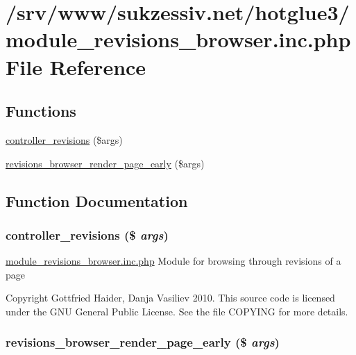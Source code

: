 \hypertarget{module__revisions__browser_8inc_8php}{
\section{/srv/www/sukzessiv.net/hotglue3/module\_\-revisions\_\-browser.inc.php File Reference}
\label{module__revisions__browser_8inc_8php}
}
\subsection*{Functions}
\begin{CompactItemize}
\item 
\hyperlink{module__revisions__browser_8inc_8php_9eda010871ad706aca87cfd7b9dd0f7d}{controller\_\-revisions} (\$args)
\item 
\hyperlink{module__revisions__browser_8inc_8php_eb482f35141c71dd933daeec9e9ce599}{revisions\_\-browser\_\-render\_\-page\_\-early} (\$args)
\end{CompactItemize}


\subsection{Function Documentation}
\hypertarget{module__revisions__browser_8inc_8php_9eda010871ad706aca87cfd7b9dd0f7d}{
\subsubsection[{controller\_\-revisions}]{\setlength{\rightskip}{0pt plus 5cm}controller\_\-revisions (\$ {\em args})}}
\label{module__revisions__browser_8inc_8php_9eda010871ad706aca87cfd7b9dd0f7d}


\hyperlink{module__revisions__browser_8inc_8php}{module\_\-revisions\_\-browser.inc.php} Module for browsing through revisions of a page

Copyright Gottfried Haider, Danja Vasiliev 2010. This source code is licensed under the GNU General Public License. See the file COPYING for more details. \hypertarget{module__revisions__browser_8inc_8php_eb482f35141c71dd933daeec9e9ce599}{
\subsubsection[{revisions\_\-browser\_\-render\_\-page\_\-early}]{\setlength{\rightskip}{0pt plus 5cm}revisions\_\-browser\_\-render\_\-page\_\-early (\$ {\em args})}}
\label{module__revisions__browser_8inc_8php_eb482f35141c71dd933daeec9e9ce599}



